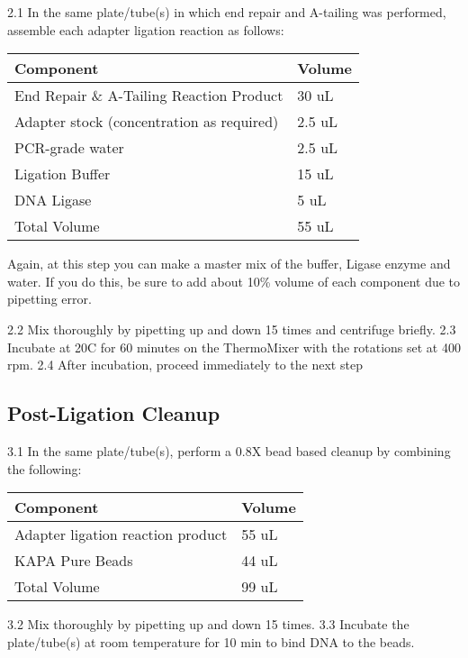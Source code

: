 \documentclass[
  letterpaper,
  DIV=11,
  numbers=noendperiod]{scrreprt}
\begin{document}
2.1 In the same plate/tube(s) in which end repair and A-tailing was
performed, assemble each adapter ligation reaction as follows:

\begin{longtable}[]{@{}ll@{}}
\toprule()
\textbf{Component} & \textbf{Volume} \\
\midrule()
\endhead
End Repair \& A-Tailing Reaction Product & 30 uL \\
Adapter stock (concentration as required) & 2.5 uL \\
PCR-grade water & 2.5 uL \\
Ligation Buffer & 15 uL \\
DNA Ligase & 5 uL \\
Total Volume & 55 uL \\
\bottomrule()
\end{longtable}

Again, at this step you can make a master mix of the buffer, Ligase
enzyme and water. If you do this, be sure to add about 10\% volume of
each component due to pipetting error.

2.2 Mix thoroughly by pipetting up and down 15 times and centrifuge
briefly. 2.3 Incubate at 20C for 60 minutes on the ThermoMixer with the
rotations set at 400 rpm. 2.4 After incubation, proceed immediately to
the next step

\hypertarget{post-ligation-cleanup}{%
\subsection*{\texorpdfstring{\textbf{Post-Ligation
Cleanup}}{Post-Ligation Cleanup}}\label{post-ligation-cleanup}}

3.1 In the same plate/tube(s), perform a 0.8X bead based cleanup by
combining the following:

\begin{longtable}[]{@{}ll@{}}
\toprule()
\textbf{Component} & \textbf{Volume} \\
\midrule()
\endhead
Adapter ligation reaction product & 55 uL \\
KAPA Pure Beads & 44 uL \\
Total Volume & 99 uL \\
\bottomrule()
\end{longtable}

3.2 Mix thoroughly by pipetting up and down 15 times. 3.3 Incubate the
plate/tube(s) at room temperature for 10 min to bind DNA to the beads.
\end{document}
